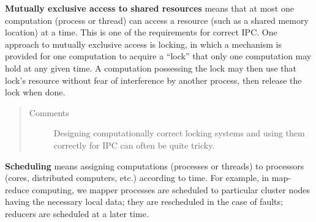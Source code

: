 \documentclass[letterpaper,10pt,english]{sphinxmanual}
\begin{document}
\textbf{Mutually exclusive access to shared resources} means that at most one computation (process or thread) can access a resource (such as a shared memory location) at a time. This is one of the requirements for correct IPC.  One approach to mutually exclusive access is locking, in which a mechanism is provided for one computation to acquire a ``lock'' that only one computation may hold at any given time. A computation possessing the lock may then use that lock's resource without fear of interference by another process, then release the lock when done.
\begin{quote}\begin{description}
\item[{Comments}] \leavevmode
Designing computationally correct locking systems and using them correctly for IPC can often be quite tricky.

\end{description}\end{quote}

\textbf{Scheduling} means assigning computations (processes or threads) to processors (cores, distributed computers, etc.) according to time. For example, in map-reduce computing, we mapper processes are scheduled to particular cluster nodes having the necessary local data; they are rescheduled in the case of faults; reducers are scheduled at a later time.



\renewcommand{\indexname}{Index}
\printindex
\end{document}
